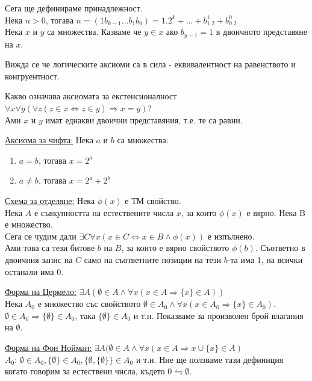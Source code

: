\documentclass[fleqn, titlepage, 12pt]{report}
\begin{document}
Сега ще дефинираме принадлежност.\\
Нека $n>0$, тогава $n = (1 b_{k-1} ... b_1 b_0) = 1.2^k + ... + b_1.2^1 + b_0.2^0$\\
Нека $ x $ и $ y $ са множества. Казваме че $y \in x$ ако $b_{y-1} = 1$ в двоичното представяне на $ x $.
\bigbreak

Вижда се че логическите аксиоми са в сила - еквивалентност на равенството и конгруентност.
\bigbreak

Какво означава аксиомата за екстенсионалност
$ \forall{x} \forall{y} ( \forall{z} (z \in x \Leftrightarrow z \in y) \Rightarrow x = y)$?\\
Ами $ x $ и $ y $ имат еднакви двоични представяния, т.е. те са равни.
\bigbreak

\underline{Аксиома за чифта:} Нека $a$ и $b$ са множества:
\begin{enumerate}
  \item $a = b$, тогава $x = 2^a$
  \item $a \neq b$, тогава $x = 2^a + 2^b$
\end{enumerate}
\bigbreak

\underline{Схема за отделяне:} Нека $ \phi(x) $ е ТМ свойство.\\
Нека $ A $ е съвкупността на естествените числа $ x $,
за които $ \phi(x) $ е вярно. Нека B е множество.\\
Сега се чудим дали $ \exists{C} \forall{x} (x \in C \Leftrightarrow x \in B \land \phi(x) )$ е изпълнено.\\
Ами това са тези битове $b$ на $ B $, за които е вярно свойството $ \phi(b) $.
Съответно в двоичния запис на $ C $ само на съответните позиции на тези $b$-та има 1, на всички останали има 0.
\bigbreak

\bigbreak
\underline{Форма на Цермело:} $ \exists{A} ( \emptyset \in A \land \forall{x} (x \in A \Rightarrow \{ x\} \in A))$\\
Нека $A_0$ е множество със свойството $ \emptyset \in  A_0 \land \forall{x} (x \in A_0 \Rightarrow \{ x\} \in A_0)$.
$ \emptyset \in A_0 \Rightarrow \{ \emptyset \} \in A_0$, така $ \{ \emptyset \} \in A_0$ и т.н.
Показваме за произволен брой влагания на $ \emptyset $.
\bigbreak

\underline{Форма на Фон Нойман:} $ \exists{A} ( \emptyset \in A \land \forall{x} (
x \in A \Rightarrow x \cup \{ x\} \in A 
)$\\
$A_0$: $ \emptyset \in  A_0, \{ \emptyset \} \in  A_0, \{ \emptyset , \{ \emptyset \}\} \in  A_0$ и т.н.
Ние ще ползваме тази дефиниция когато говорим за естествени числа, където $0 \leftrightharpoons \emptyset $.
\bigbreak
\end{document}
